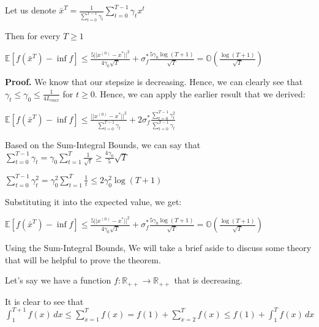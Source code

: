 Let us denote $\bar{x}^T = \frac{1}{\sum_{t = 0}^{T - 1} \gamma_t} \sum_{t = 0}^{T - 1} \gamma_t x^t$ \newline 

Then for every $T \geq 1$ \newline 

$\mathbb{E}[f(\bar{x}^T) - \inf f] \leq \frac{5 ||x^{(0)} - x^*||^2}{4 \gamma_0 \sqrt{T}} + \sigma_f^* \frac{5 \gamma_0 \log{(T + 1)}}{\sqrt{T}} = \mathbb{O}(\frac{\log{(T + 1)}}{\sqrt{T}})$ \newline 

\noindent \textbf{Proof.} We know that our stepsize is decreasing. Hence, we can clearly see that $\gamma_t \leq \gamma_0 \leq \frac{1}{4L_{max}}$ for $t \geq 0$. Hence, we can apply the earlier result that we derived: \newline 

$\mathbb{E}[f(\bar{x}^T) - \inf f] \leq \frac{||x^{(0)} - x^*||^2}{\sum_{t = 0}^{T - 1} \gamma_t} + 2\sigma_f^* \frac{\sum_{t = 0}^{T - 1} \gamma_t^2}{\sum_{t = 0}^{T - 1} \gamma_t}$ \newline 

Based on the Sum-Integral Bounds, we can say that $\sum_{t = 0}^{T - 1} \gamma_t = \gamma_0 \sum_{t = 1}^{T} \frac{1}{\sqrt{t}} \geq \frac{4\gamma_0}{5} \sqrt{T}$ \newline 

$\sum_{t = 0}^{T - 1} \gamma_t^2 = \gamma_0^2 \sum_{t = 1}^{T} \frac{1}{t} \leq 2 \gamma_0^2 \log(T + 1)$ \newline

Substituting it into the expected value, we get: \newline 

$\mathbb{E}[f(\bar{x}^T) - \inf f] \leq \frac{5 ||x^{(0)} - x^*||^2}{4 \gamma_0 \sqrt{T}} + \sigma_f^* \frac{5 \gamma_0 \log{(T + 1)}}{\sqrt{T}} = \mathbb{O}(\frac{\log{(T + 1)}}{\sqrt{T}})$ \newline 


Using the Sum-Integral Bounds, We will take a brief aside to discuss some theory that will be helpful to prove the theorem.  \newline 

Let's say we have a function $f: \mathbb{R}_{++} \rightarrow \mathbb{R}_{++}$ that is decreasing. \newline 

It is clear to see that $\int_{1}^{T + 1} f(x) \,dx \leq \sum_{x=1}^{T} f(x) = f(1) +  \sum_{x=2}^{T} f(x) \leq f(1) + \int_{1}^{T} f(x) \,dx$ \newline 

